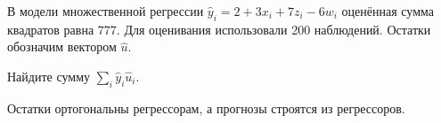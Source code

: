 
\begin{question}
В модели множественной регрессии \(\hat y_i = 2 + 3 x_i + 7 z_i -6 w_i\) оценённая сумма квадратов равна \(777\).
Для оценивания использовали 200 наблюдений. Остатки обозначим вектором \(\hat u\).

Найдите сумму \(\sum_i \hat y_i \hat u_i\).
\end{question}

\begin{solution}
Остатки ортогональны регрессорам, а прогнозы строятся из регрессоров.
\end{solution}

